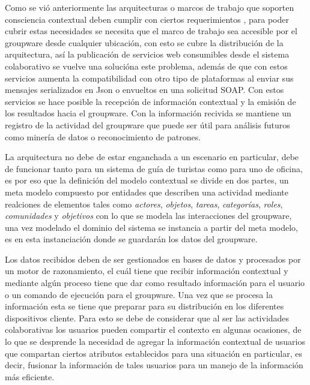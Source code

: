 Como se vi\'o anteriormente las arquitecturas o marcos de trabajo que soporten consciencia contextual deben cumplir con ciertos requerimientos \cite{dey1999architecture}, para poder cubrir estas necesidades se necesita que el marco de trabajo sea accesible por el groupware desde cualquier ubicaci\'on, con esto se cubre la distribuci\'on de la arquitectura, as\'i la publicaci\'on de servicios web consumibles desde el sistema colaborativo se vuelve una soluci\'ona este problema, adem\'as de que con estos servicios aumenta la compatibilidad con otro tipo de plataformas al enviar sus mensajes serializados en Json o envueltos en una solicitud SOAP. Con estos servicios se hace posible la recepci\'on de informaci\'on contextual y la emisi\'on de los resultados hacia el groupware. Con la informaci\'on recivida se mantiene un registro de la actividad del groupware que puede ser \'util para an\'alisis futuros como miner\'ia de datos o reconocimiento de patrones.

La arquitectura no debe de estar enganchada a un escenario en particular, debe de funcionar tanto para un sistema de gu\'ia de turistas como para uno de oficina, es por eso que la definici\'on del modelo contextual se divide en dos partes, un meta modelo compuesto por entidades que describen una actividad mediante realciones de elementos tales como \textit{actores}, \textit{objetos}, \textit{tareas}, \textit{categor\'ias}, \textit{roles}, \textit{comunidades} y \textit{objetivos} con lo que se modela las interacciones del groupware, una vez modelado el dominio del sistema se instancia a partir del meta modelo, es en esta instanciaci\'on donde se guardar\'an los datos del groupware.

Los datos recibidos deben de ser gestionados en bases de datos y procesados por un motor de razonamiento, el cu\'al tiene que recibir informaci\'on contextual y mediante alg\'un proceso tiene que dar como resultado informaci\'on para el usuario o un comando de ejecuci\'on para el groupware. Una vez que se procesa la informaci\'on esta se tiene que preparar para su distribuci\'on en los diferentes dispositivos cliente. Para esto se debe de considerar que al ser las actividades colaborativas los usuarios pueden compartir el contexto en algunas ocasiones, de lo que se desprende la necesidad de agregar la informaci\'on contextual de usuarios que compartan ciertos atributos establecidos para una situaci\'on en particular, es decir, fusionar la informaci\'on de tales usuarios para un manejo de la informaci\'on m\'as eficiente.

